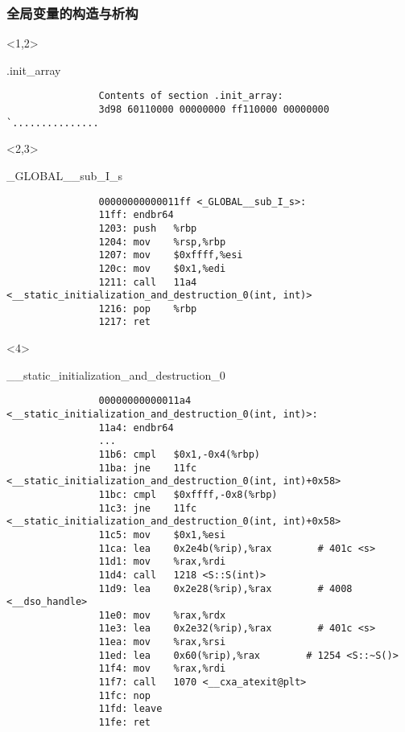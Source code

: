 \documentclass[UTF8,lualatex]{ctexbeamer}
\begin{document}
\begin{frame}[fragile]
    \frametitle{全局变量的构造与析构}
    \scriptsize
    \begin{onlyenv}<1,2>
        \begin{block}{.init\_array}
            \begin{verbatim}
                Contents of section .init_array:
                3d98 60110000 00000000 ff110000 00000000  `...............
            \end{verbatim}
        \end{block}
    \end{onlyenv}
    \begin{onlyenv}<2,3>
        \begin{block}{\_GLOBAL\_\_sub\_I\_s}
            \begin{verbatim}
                00000000000011ff <_GLOBAL__sub_I_s>:
                11ff: endbr64
                1203: push   %rbp
                1204: mov    %rsp,%rbp
                1207: mov    $0xffff,%esi
                120c: mov    $0x1,%edi
                1211: call   11a4 <__static_initialization_and_destruction_0(int, int)>
                1216: pop    %rbp
                1217: ret
            \end{verbatim}
        \end{block}
    \end{onlyenv}
    \begin{onlyenv}<4>
        \begin{block}{\_\_static\_initialization\_and\_destruction\_0}
            \begin{verbatim}
                00000000000011a4 <__static_initialization_and_destruction_0(int, int)>:
                11a4: endbr64
                ...
                11b6: cmpl   $0x1,-0x4(%rbp)
                11ba: jne    11fc <__static_initialization_and_destruction_0(int, int)+0x58>
                11bc: cmpl   $0xffff,-0x8(%rbp)
                11c3: jne    11fc <__static_initialization_and_destruction_0(int, int)+0x58>
                11c5: mov    $0x1,%esi
                11ca: lea    0x2e4b(%rip),%rax        # 401c <s>
                11d1: mov    %rax,%rdi
                11d4: call   1218 <S::S(int)>
                11d9: lea    0x2e28(%rip),%rax        # 4008 <__dso_handle>
                11e0: mov    %rax,%rdx
                11e3: lea    0x2e32(%rip),%rax        # 401c <s>
                11ea: mov    %rax,%rsi
                11ed: lea    0x60(%rip),%rax        # 1254 <S::~S()>
                11f4: mov    %rax,%rdi
                11f7: call   1070 <__cxa_atexit@plt>
                11fc: nop
                11fd: leave
                11fe: ret
            \end{verbatim}
        \end{block}
    \end{onlyenv}
\end{frame}
\end{document}
